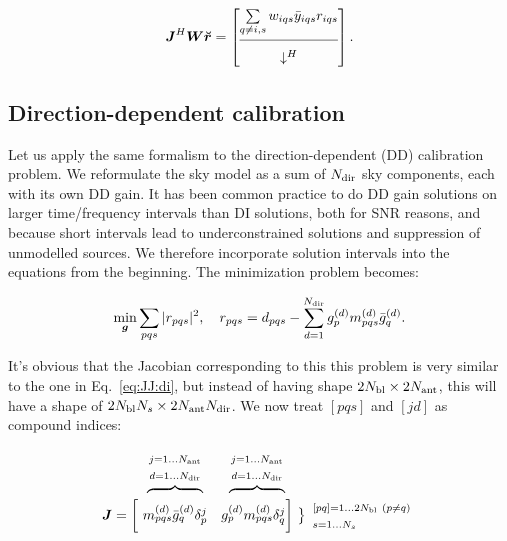 \documentclass[useAMS,usenatbib]{mn2e}
\newcommand{\mat}[1]{{\bmath{#1}}}
\newcommand{\JJ}{\mat{J}} %
\newcommand{\MM}{\mat{M}}
\newcommand{\GG}{\mat{G}}
\begin{document}
\begin{equation}
\label{eq:JHR:DI:tfw}
\JJ^H\mat{W}\Rr 
= \Matrix{c}{
\sum\limits_{q\ne i,s} w_{iqs} \bar{y}_{iqs} r_{iqs}   \\
\hline\\[-8pt]
\downarrow^H
}.
\end{equation}


\subsection{Direction-dependent calibration}
\label{sec:unpol:DD}

Let us apply the same formalism to the direction-dependent (DD) calibration problem. 
We reformulate the sky model as a sum of $N_\mathrm{dir}$ sky components, each with its own DD 
gain. It has been common practice to do DD gain solutions on larger time/frequency intervals than DI 
solutions, both for SNR reasons, and because short intervals lead to underconstrained solutions
and suppression of unmodelled sources. We therefore incorporate solution intervals into the
equations from the beginning. The minimization problem becomes:

\newcommand{\GGd}{\GG^{(d)}}
\newcommand{\GGdH}{\GG^{(d)H}}
\newcommand{\MMd}{\MM^{(d)}}
\newcommand{\YYd}{\YY^{(d)}}
\newcommand{\YYdH}{\YY^{(d)H}}
\newcommand{\YYc}{\YY^{(c)}}
\newcommand{\YYcH}{\YY^{(c)H}}
\newcommand{\ggd}{g^{(d)}}
\newcommand{\ggdH}{\bar{g}^{(d)}}
\newcommand{\ggc}{g^{(c)}}
\newcommand{\ggcH}{\bar{g}^{(c)}}
\newcommand{\mmc}{m^{(c)}}
\newcommand{\mmd}{m^{(d)}}
\newcommand{\mmcH}{\bar{m}^{(c)}}
\newcommand{\mmdH}{\bar{m}^{(d)}}
\newcommand{\yyd}{y^{(d)}}
\newcommand{\yydH}{\bar{y}^{(d)}}
\newcommand{\yyc}{y^{(c)}}
\newcommand{\yycH}{\bar{y}^{(c)}}

\begin{equation}
\label{eq:cal:dd:unpol}
\min_{\bmath{g}}\sum_{pqs}|r_{pqs}|^2, ~~~
r_{pqs} = d_{pqs} - \sum_{d=1}^{\Nd} \ggd_p \mmd_{pqs} \ggdH_q.
\end{equation}

It's obvious that the Jacobian corresponding to this  this problem is very similar to the one 
in Eq.~\ref{eq:JJ:di}, but instead of having shape $2N_\mathrm{bl}\times2N_\mathrm{ant}$, this will have a 
shape of $2N_\mathrm{bl}N_s\times 2N_\mathrm{ant}N_\mathrm{dir}$. We now treat $[pqs]$ and $[jd]$ as compound indices: 

\[
\begin{array}{r@{~}cc@{~}cc}
 & \overbrace{~~~~~~~~~~~~}^{\Stack{\scriptstyle j=1\dots \Na\\\scriptstyle d=1\dots \Nd}} & 
   \overbrace{~~~~~~~~~~~~}^{\Stack{\scriptstyle j=1\dots \Na\\\scriptstyle d=1\dots \Nd}} \\
\JJ = \bigg [ &
  \mmd_{pqs}\ggdH_q \delta^j_p & 
  \ggd_p \mmd_{pqs}  \delta^j_q 
\bigg ] &
\big \}
\begin{array}{l}
\scriptstyle [pq]=1\dots 2\Nbl~(p\ne q)\\ \scriptstyle s=1\dots\Ns
\end{array}

\end{array}
\]
\end{document}
